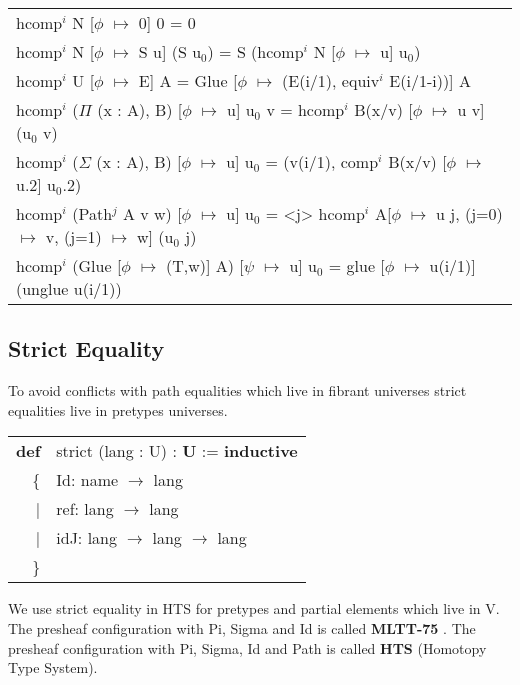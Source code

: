 \documentclass[a4paper,UKenglish,cleveref, autoref, thm-restate]{lipics-v2021}
\newcommand{\tabstyle}[0]{\scriptsize\ttfamily\fontseries{l}\selectfont}
\begin{document}
\begin{table}[ht]
\tabstyle
\begin{tabular}{l}
hcomp$^i$ N [$\phi$ $\mapsto$ 0] 0 = 0 \\
hcomp$^i$ N [$\phi$ $\mapsto$ S u] (S u$_0$) = S (hcomp$^i$ N [$\phi$ $\mapsto$ u] u$_0$) \\
hcomp$^i$ U [$\phi$ $\mapsto$ E] A = Glue [$\phi$ $\mapsto$ (E(i/1), equiv$^i$ E(i/1-i))] A \\
hcomp$^i$ ($\Pi$ (x : A), B) [$\phi$ $\mapsto$ u] u$_0$ v = hcomp$^i$ B(x/v) [$\phi$ $\mapsto$ u v] (u$_0$ v) \\
hcomp$^i$ ($\Sigma$ (x : A), B) [$\phi$ $\mapsto$ u] u$_0$ = (v(i/1), comp$^i$ B(x/v) [$\phi$ $\mapsto$ u.2] u$_0$.2) \\
hcomp$^i$ (Path$^j$ A v w) [$\phi$ $\mapsto$ u] u$_0$ = <j> hcomp$^i$ A[$\phi$ $\mapsto$ u j, (j=0) $\mapsto$ v, (j=1) $\mapsto$ w] (u$_0$ j) \\
hcomp$^i$ (Glue [$\phi$ $\mapsto$ (T,w)] A) [$\psi$ $\mapsto$ u] u$_0$ = glue [$\phi$ $\mapsto$ u(i/1)] (unglue u(i/1)) \\
\end{tabular}
\end{table}

\subsection{Strict Equality}

To avoid conflicts with path equalities which live in fibrant universes strict
equalities live in pretypes universes.

\begin{table}[ht!]
\tabstyle
\begin{tabular}{rl}
     \textbf{def} & strict (lang : U) : \textbf{U} := \textbf{inductive} \\\
 \{ & Id: name $\rightarrow$ lang \\
  |& ref: lang $\rightarrow$ lang \\
  |& idJ: lang $\rightarrow$ lang $\rightarrow$ lang \\
                         \} & \\
\end{tabular}
\end{table}

We use strict equality in HTS for pretypes and partial elements which live in V.
The presheaf configuration with Pi, Sigma and Id is called \textbf{MLTT-75} \cite{MLTT75}. The presheaf
configuration with Pi, Sigma, Id and Path is called \textbf{HTS} (Homotopy Type System).
\end{document}
